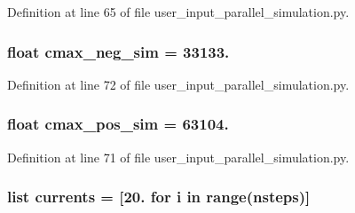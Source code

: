 Definition at line 65 of file user\-\_\-input\-\_\-parallel\-\_\-simulation.\-py.

\hypertarget{namespaceuser__input__parallel__simulation_ab7633a5e9c70aabfe6992e4fe521a1f9}{
\subsubsection[{cmax\-\_\-neg\-\_\-sim}]{\setlength{\rightskip}{0pt plus 5cm}float cmax\-\_\-neg\-\_\-sim = 33133.}}\label{namespaceuser__input__parallel__simulation_ab7633a5e9c70aabfe6992e4fe521a1f9}


Definition at line 72 of file user\-\_\-input\-\_\-parallel\-\_\-simulation.\-py.

\hypertarget{namespaceuser__input__parallel__simulation_aa5b015cc7d0bda453c6163023448db72}{
\subsubsection[{cmax\-\_\-pos\-\_\-sim}]{\setlength{\rightskip}{0pt plus 5cm}float cmax\-\_\-pos\-\_\-sim = 63104.}}\label{namespaceuser__input__parallel__simulation_aa5b015cc7d0bda453c6163023448db72}


Definition at line 71 of file user\-\_\-input\-\_\-parallel\-\_\-simulation.\-py.

\hypertarget{namespaceuser__input__parallel__simulation_a216022bdba987f127b6cc081ee78e2bd}{
\subsubsection[{currents}]{\setlength{\rightskip}{0pt plus 5cm}list currents = \mbox{[}20. for i in range({\bf nsteps})\mbox{]}}}\label{namespaceuser__input__parallel__simulation_a216022bdba987f127b6cc081ee78e2bd}


